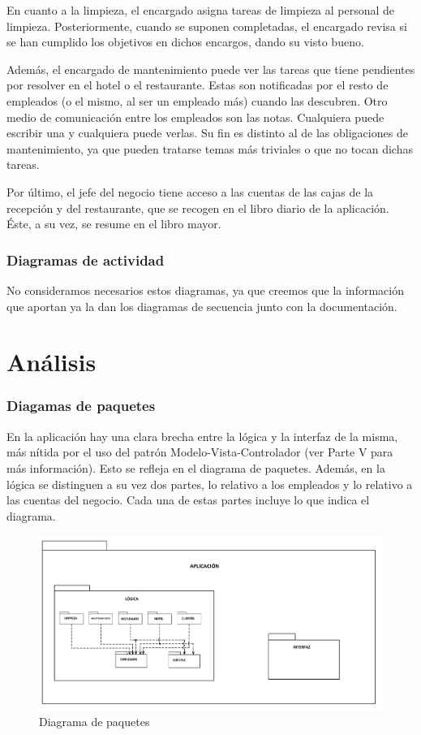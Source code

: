 \documentclass[spanish,a4paper,11pt, twoside]{report}	%
\begin{document}
	En cuanto a la limpieza, el encargado asigna tareas de limpieza al personal de limpieza. Posteriormente, cuando se suponen completadas, el encargado revisa si se han cumplido los objetivos en dichos encargos, dando su visto bueno.

	Además, el encargado de mantenimiento puede ver las tareas que tiene pendientes por resolver en el hotel o el restaurante. Estas son notificadas por el resto de empleados (o el mismo, al ser un empleado más) cuando las descubren. Otro medio de comunicación entre los empleados son las notas. Cualquiera puede escribir una y cualquiera puede verlas. Su fin es distinto al de las obligaciones de mantenimiento, ya que pueden tratarse temas más triviales o que no tocan dichas tareas.
		
	Por último, el jefe del negocio tiene acceso a las cuentas de las cajas de la recepción y del restaurante, que se recogen en el libro diario de la aplicación. Éste, a su vez, se resume en el libro mayor.


	\section{Diagramas de actividad}
	No consideramos necesarios estos diagramas, ya que creemos que la información que aportan ya la dan los diagramas de secuencia junto con la documentación.



\newpage
\mbox{}
\thispagestyle{empty}						%
\newpage



\setcounter{section}{0}
\part{Análisis}
	\section{Diagamas de paquetes}
	En la aplicación hay una clara brecha entre la lógica y la interfaz de la misma, más nítida por el uso del patrón Modelo-Vista-Controlador (ver Parte V para más información). Esto se refleja en el diagrama de paquetes. Además, en la lógica se distinguen a su vez dos partes, lo relativo a los empleados y lo relativo a las cuentas del negocio. Cada una de estas partes incluye lo que indica el diagrama.
	\begin{figure}[!h]
	\centering
	\includegraphics[scale=0.15]{diagramadepaquetes.png}	
	\caption{Diagrama de paquetes}
	\end{figure}
\end{document}
